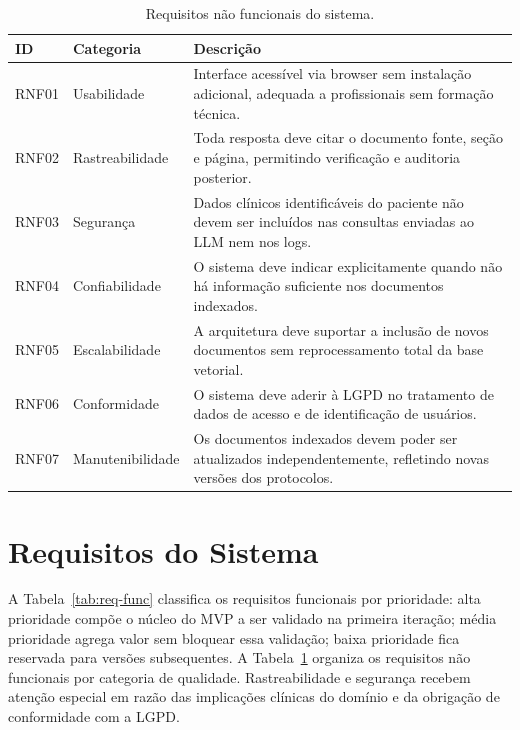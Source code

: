 \documentclass[conference,a4paper]{IEEEtran}
\begin{document}
\begin{table}[!t]
  \centering
  \caption{Requisitos não funcionais do sistema.}
  \label{tab:req-nfunc}
  \begin{tabularx}{\textwidth}{llX}
    \toprule
    \textbf{ID} & \textbf{Categoria} & \textbf{Descrição} \\
    \midrule
    RNF01 & Usabilidade      & Interface acessível via browser sem instalação adicional, adequada a profissionais sem formação técnica. \\
    RNF02 & Rastreabilidade  & Toda resposta deve citar o documento fonte, seção e página, permitindo verificação e auditoria posterior. \\
    RNF03 & Segurança        & Dados clínicos identificáveis do paciente não devem ser incluídos nas consultas enviadas ao LLM nem nos logs. \\
    RNF04 & Confiabilidade   & O sistema deve indicar explicitamente quando não há informação suficiente nos documentos indexados. \\
    RNF05 & Escalabilidade   & A arquitetura deve suportar a inclusão de novos documentos sem reprocessamento total da base vetorial. \\
    RNF06 & Conformidade     & O sistema deve aderir à LGPD no tratamento de dados de acesso e de identificação de usuários. \\
    RNF07 & Manutenibilidade & Os documentos indexados devem poder ser atualizados independentemente, refletindo novas versões dos protocolos. \\
    \bottomrule
  \end{tabularx}
\end{table}


\section{Requisitos do Sistema}
\label{sec:req}

A Tabela~\ref{tab:req-func} classifica os requisitos
funcionais por prioridade: alta prioridade compõe o núcleo do MVP a
ser validado na primeira iteração; média prioridade agrega valor sem
bloquear essa validação; baixa prioridade fica reservada para versões
subsequentes. A Tabela~\ref{tab:req-nfunc} organiza os requisitos não
funcionais por categoria de qualidade. Rastreabilidade e segurança
recebem atenção especial em razão das implicações clínicas do domínio
e da obrigação de conformidade com a LGPD.
\end{document}

